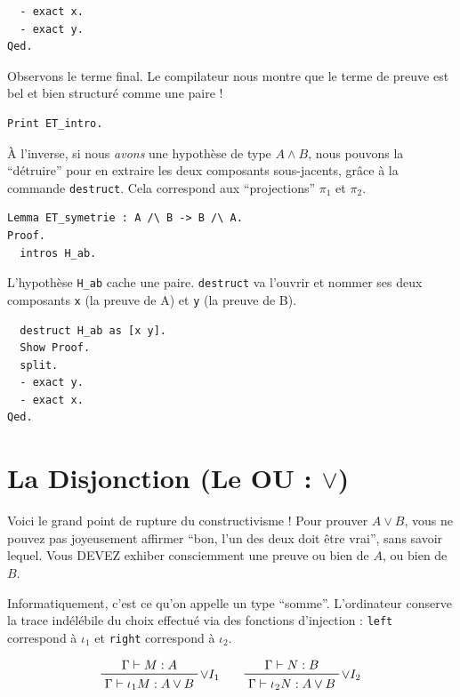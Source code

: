 \documentclass[11pt,a4paper]{article}
\begin{document}
\begin{lstlisting}
  - exact x.
  - exact y.
Qed.
\end{lstlisting}

\begin{remarque}{}{}
  Observons le terme final. Le compilateur nous montre que le terme de preuve est bel et bien structuré comme une paire !
\end{remarque}

\begin{lstlisting}
Print ET_intro.
\end{lstlisting}

À l'inverse, si nous \textit{avons} une hypothèse de type $A \land B$, nous pouvons la ``détruire'' pour en extraire les deux composants sous-jacents, grâce à la commande \texttt{destruct}. Cela correspond aux ``projections'' $\pi_1$ et $\pi_2$.

\begin{lstlisting}
Lemma ET_symetrie : A /\ B -> B /\ A.
Proof.
  intros H_ab.
\end{lstlisting}

L'hypothèse \texttt{H\_ab} cache une paire. \texttt{destruct} va l'ouvrir et nommer ses deux composants \texttt{x} (la preuve de A) et \texttt{y} (la preuve de B).

\begin{lstlisting}
  destruct H_ab as [x y].
  Show Proof.
  split.
  - exact y.
  - exact x.
Qed.
\end{lstlisting}

\section{La Disjonction (Le OU : $\lor$)}

Voici le grand point de rupture du constructivisme ! Pour prouver $A \lor B$, vous ne pouvez pas joyeusement affirmer ``bon, l'un des deux doit être vrai'', sans savoir lequel. Vous DEVEZ exhiber consciemment une preuve ou bien de $A$, ou bien de $B$.

Informatiquement, c'est ce qu'on appelle un type ``somme''. L'ordinateur conserve la trace indélébile du choix effectué via des fonctions d'injection : \texttt{left} correspond à $\iota_1$ et \texttt{right} correspond à $\iota_2$.

$$\prftree[r]{${\lor}I_1$}{\Gamma \vdash M : A}{\Gamma \vdash \iota_1 M : A \lor B} \qquad \prftree[r]{${\lor}I_2$}{\Gamma \vdash N : B}{\Gamma \vdash \iota_2 N : A \lor B}$$
\end{document}
